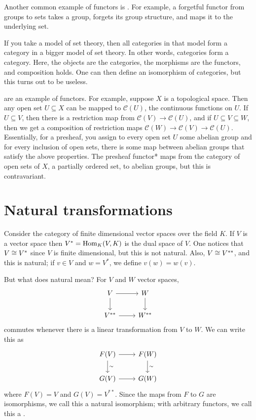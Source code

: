 \documentclass[11pt, oneside]{article}
\begin{document}
Another common example of functors is \href{https://en.wikipedia.org/wiki/Forgetful_functor}{}. For example, a forgetful functor from groups to sets takes a group, forgets its group structure, and maps it to the underlying set.

If you take a model of set theory, then all categories in that model form a category in a bigger model of set theory. In other words, categories form a category. Here, the objects are the categories, the morphisms are the functors, and composition holds. One can then define an isomorphism of categories, but this turns out to be useless. 

\href{https://en.wikipedia.org/wiki/Sheaf_(mathematics)#Presheaves}{} are an example of functors. For example, suppose $X$ is a topological space. Then any open set $U\subseteq X$ can be mapped to $\mathscr{C}(U)$, the continuous functions on $U$. If $U\subseteq V$, then there is a restriction map from $\mathscr{C}(V) \longrightarrow \mathscr{C}(U)$, and if $U\subseteq V\subseteq W$, then we get a composition of restriction maps $\mathscr{C}(W) \longrightarrow \mathscr{C}(V) \longrightarrow \mathscr{C}(U)$. Essentially, for a presheaf, you assign to every open set $U$ some abelian group and for every inclusion of open sets, there is some map between abelian groups that satisfy the above properties. The presheaf functor* maps from the category of open sets of $X$, a partially ordered set, to abelian groups, but this is contravariant.


\section{Natural transformations}
Consider the category of finite dimensional vector spaces over the field $K$. If $V$ is a vector space then $V^*=\operatorname{Hom}_K(V,K)$ is the dual space of $V$. One notices that $V\cong V^*$ since $V$ is finite dimensional, but this is not natural. Also, $V\cong V^{**}$, and this is natural; if $v\in V$ and $w = V^*$, we define $v(w) = w(v)$. 

But what does natural mean? For $V$ and $W$ vector spaces, 
\[
\begin{tikzcd}
V \arrow[r] \arrow[d] & W \arrow[d]\\ V^{**} \arrow[r] & W^{**}
\end{tikzcd}
\]
commutes whenever there is a linear transformation from $V$ to $W$. We can write this as
\[
\begin{tikzcd}
F(V) \arrow[r] \arrow[d, "\sim"] & F(W) \arrow[d,"\sim"]\\ G(V) \arrow[r] & G(W)
\end{tikzcd}
\]
where $F(V) = V$ and $G(V) = V^{**}$. Since the maps from $F$ to $G$ are isomorphisms, we call this a natural isomorphism; with arbitrary functors, we call this a \href{https://en.wikipedia.org/wiki/Natural_transformation}{}.
\end{document}
